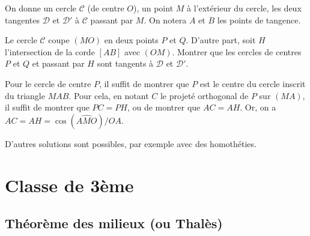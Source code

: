 \begin{exo} %
% 
 On donne un cercle  $\mathcal C$ (de centre $O$), un point $M$ à l'extérieur du cercle, les deux tangentes $\mathcal D$ et $\mathcal D'$ à $\mathcal C$ passant par $M$. On notera $A$ et $B$ les points de tangence. 

Le cercle $\mathcal C$ coupe $(MO)$ en deux points $P$ et $Q$. D'autre part, soit $H$ l'intersection de la corde $[AB]$ avec $(OM)$. Montrer que les cercles de centres $P$ et $Q$ et passant par $H$ sont tangents à $\mathcal D$ et $\mathcal D'$. 


\begin{sol} 
Pour le cercle de centre $P$, il suffit de montrer que $P$ est le centre du cercle inscrit du triangle $MAB$. Pour cela, en notant $C$ le projeté orthogonal de $P$ sur $(MA)$, il suffit de montrer que $PC=PH$, ou de montrer que $AC=AH$. Or, on a $AC=AH = \cos(\widehat{AMO}) / OA$.

D'autres solutions sont possibles, par exemple avec des homothéties.
\end{sol}  
\end{exo}  




\section{Classe de 3ème}














\subsection{Théorème des milieux (ou Thalès)}

